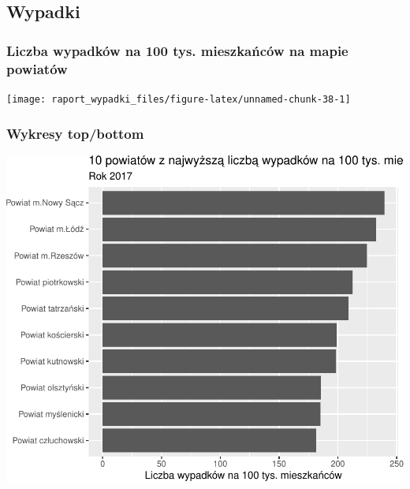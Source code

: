 \documentclass[
]{article}
\begin{document}
\hypertarget{wypadki}{%
\subsection{Wypadki}\label{wypadki}}

\hypertarget{liczba-wypadkuxf3w-na-100-tys.-mieszkaux144cuxf3w-na-mapie-powiatuxf3w}{%
\subsubsection{Liczba wypadków na 100 tys. mieszkańców na mapie
powiatów}\label{liczba-wypadkuxf3w-na-100-tys.-mieszkaux144cuxf3w-na-mapie-powiatuxf3w}}

\begin{flushleft}\texttt{[image: raport\_wypadki\_files/figure-latex/unnamed-chunk-38-1]} \end{flushleft}

\hypertarget{wykresy-topbottom}{%
\subsubsection{Wykresy top/bottom}\label{wykresy-topbottom}}

\begin{flushleft}\includegraphics{raport_wypadki_files/figure-latex/unnamed-chunk-39-1} \end{flushleft}
\end{document}
